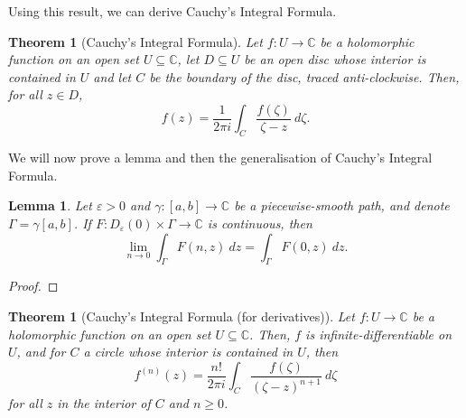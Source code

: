 \documentclass[a4paper, openany]{memoir}
\theoremstyle{definition}
\theoremstyle{plain}
\newtheorem{theorem}[definition]{Theorem}
\newtheorem{lemma}[definition]{Lemma}
\begin{document}
    Using this result, we can derive Cauchy's Integral Formula.
    \begin{theorem}[Cauchy's Integral Formula]
        Let $f \colon U \to \mathbb{C}$ be a holomorphic function on an open set $U \subseteq \mathbb{C}$, let $D \subseteq U$ be an open disc whose interior is contained in $U$ and let $C$ be the boundary of the disc, traced anti-clockwise. Then, for all $z \in D$,
        \[f(z) = \frac{1}{2\pi i} \int_C \frac{f(\zeta)}{\zeta - z} \ d\zeta.\]
    \end{theorem}
    \noindent We will now prove a lemma and then the generalisation of Cauchy's Integral Formula.
    \begin{lemma}
        Let $\varepsilon > 0$ and $\gamma \colon [a, b] \to \mathbb{C}$ be a piecewise-smooth path, and denote $\Gamma = \gamma [a, b]$. If $F \colon D_\varepsilon(0) \times \Gamma \to \mathbb{C}$ is continuous, then
        \[\lim_{n \to 0} \int_\Gamma F(n, z) \ dz = \int_\Gamma F(0, z) \ dz.\]
    \end{lemma}
    \begin{proof}
    \end{proof}
    \begin{theorem}[Cauchy's Integral Formula (for derivatives)]
        Let $f \colon U \to \mathbb{C}$ be a holomorphic function on an open set $U \subseteq \mathbb{C}$. Then, $f$ is infinite-differentiable on $U$, and for $C$ a circle whose interior is contained in $U$, then
        \[f^{(n)}(z) = \frac{n!}{2\pi i} \int_C \frac{f(\zeta)}{(\zeta - z)^{n+1}} \ d\zeta\]
        for all $z$ in the interior of $C$ and $n \geq 0$.
    \end{theorem}
\end{document}
